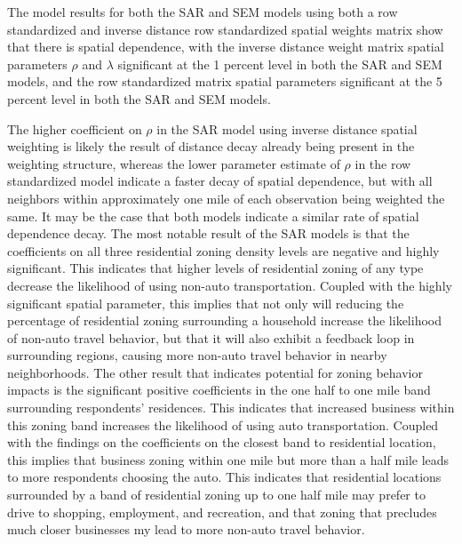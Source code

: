 \begin{singlespace}\tiny

\end{singlespace}

The model results for both the SAR and SEM models using both a row standardized and inverse distance row standardized spatial weights matrix show that there is spatial dependence, with the inverse distance weight matrix spatial parameters $\rho$ and $\lambda$ significant at the 1 percent level in both the SAR and SEM models, and the row standardized matrix spatial parameters significant at the 5 percent level in both the SAR and SEM models.  

The higher coefficient on $\rho$ in the SAR model using inverse distance spatial weighting is likely the result of distance decay already being present in the weighting structure, whereas the lower parameter estimate of $\rho$ in the row standardized model indicate a faster decay of spatial dependence, but with all neighbors within approximately one mile of each observation being weighted the same.  It may be the case that both models indicate a similar rate of spatial dependence decay.  The most notable result of the SAR models is that the coefficients on all three residential zoning density levels are negative and highly significant.  This indicates that higher levels of residential zoning of any type decrease the likelihood of using non-auto transportation.  Coupled with the highly significant spatial parameter, this implies that not only will reducing the percentage of residential zoning surrounding a household increase the likelihood of non-auto travel behavior, but that it will also exhibit a feedback loop in surrounding regions, causing more non-auto travel behavior in nearby neighborhoods.  The other result that indicates potential for zoning behavior impacts is the significant positive coefficients in the one half to one mile band surrounding respondents' residences.  This indicates that increased business within this zoning band increases the likelihood of using auto transportation.  Coupled with the findings on the coefficients on the closest band to residential location, this implies that business zoning within one mile but more than a half mile leads to more respondents choosing the auto.  This indicates that residential locations surrounded by a band of residential zoning up to one half mile may prefer to drive to shopping, employment, and recreation, and that zoning that precludes much closer businesses my lead to more non-auto travel behavior.

